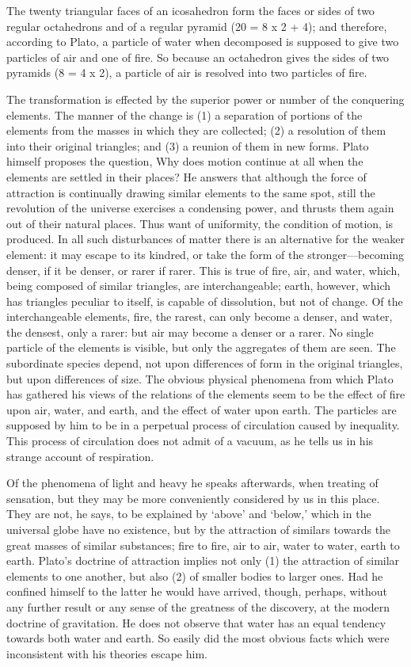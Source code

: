 The twenty triangular faces of an icosahedron form the faces or sides of
two regular octahedrons and of a regular pyramid (20 = 8 x 2 + 4); and
therefore, according to Plato, a particle of water when decomposed is
supposed to give two particles of air and one of fire. So because an
octahedron gives the sides of two pyramids (8 = 4 x 2), a particle of air
is resolved into two particles of fire.

The transformation is effected by the superior power or number of the
conquering elements. The manner of the change is (1) a separation of
portions of the elements from the masses in which they are collected; (2)
a resolution of them into their original triangles; and (3) a reunion of
them in new forms. Plato himself proposes the question, Why does motion
continue at all when the elements are settled in their places? He answers
that although the force of attraction is continually drawing similar
elements to the same spot, still the revolution of the universe exercises
a condensing power, and thrusts them again out of their natural places.
Thus want of uniformity, the condition of motion, is produced. In all such
disturbances of matter there is an alternative for the weaker element: it
may escape to its kindred, or take the form of the stronger—becoming
denser, if it be denser, or rarer if rarer. This is true of fire, air, and
water, which, being composed of similar triangles, are interchangeable;
earth, however, which has triangles peculiar to itself, is capable of
dissolution, but not of change. Of the interchangeable elements, fire, the
rarest, can only become a denser, and water, the densest, only a rarer:
but air may become a denser or a rarer. No single particle of the elements
is visible, but only the aggregates of them are seen. The subordinate
species depend, not upon differences of form in the original triangles,
but upon differences of size. The obvious physical phenomena from which
Plato has gathered his views of the relations of the elements seem to be
the effect of fire upon air, water, and earth, and the effect of water
upon earth. The particles are supposed by him to be in a perpetual process
of circulation caused by inequality. This process of circulation does not
admit of a vacuum, as he tells us in his strange account of respiration.

Of the phenomena of light and heavy he speaks afterwards, when treating of
sensation, but they may be more conveniently considered by us in this
place. They are not, he says, to be explained by ‘above’ and ‘below,’
which in the universal globe have no existence, but by the attraction of
similars towards the great masses of similar substances; fire to fire, air
to air, water to water, earth to earth. Plato’s doctrine of attraction
implies not only (1) the attraction of similar elements to one another,
but also (2) of smaller bodies to larger ones. Had he confined himself to
the latter he would have arrived, though, perhaps, without any further
result or any sense of the greatness of the discovery, at the modern
doctrine of gravitation. He does not observe that water has an equal
tendency towards both water and earth. So easily did the most obvious
facts which were inconsistent with his theories escape him.

